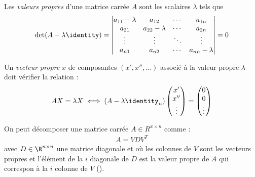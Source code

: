                 \begin{definition}
                    Les \textit{valeurs propres} d'une matrice carrée \(A\) sont les scalaires \(\lambda\) tels que
                    \[
                        \det(A - \lambda\identity) = \begin{vmatrix}
                            a_{11} - \lambda & a_{12}           & \cdots    & a_{1n}\\
                            a_{21}           & a_{22} - \lambda & \cdots    & a_{2n}\\
                            \vdots           & \vdots           & \ddots    & \vdots\\
                            a_{n1}           & a_{n2}           & \cdots    & a_{nn} - \lambda
                        \end{vmatrix} = 0
                    \]

                    Un \textit{vecteur propre} \(x\) de composantes \((x', x'', \dots)\) associé à la valeur propre \(\lambda\) doit vérifier la relation :
                    \[
                        AX = \lambda X \iff (A - \lambda\identity_n) \begin{pmatrix}
                            x'\\
                            x''\\
                            \vdots
                        \end{pmatrix} = \begin{pmatrix}
                            0\\
                            0\\
                            \vdots
                        \end{pmatrix}
                    \]

                    On peut décomposer une matrice carrée \(A \in R^{x \times n}\) comme :
                    \begin{align*}
                        A = V D V^T
                    \end{align*}
                    avec \(D \in \R^{n \times n}\) une matrice diagonale et où les colonnes de \(V\) sont les vecteurs propres et l'élément de la \(i\)\ieme{} diagonale de \(D\) est la valeur propre de \(A\) qui correspon à la \(i\)\ieme{} colonne de \(V\) (\cite{burden2010numerical}).
                \end{definition}

